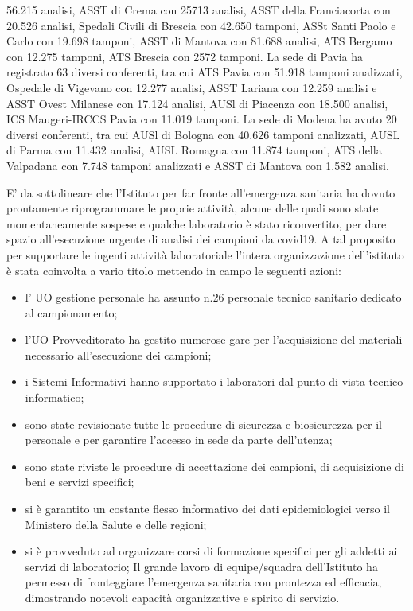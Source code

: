 \documentclass[
  12pt,
]{article}
\providecommand{\tightlist}{%
  \setlength{\itemsep}{0pt}\setlength{\parskip}{0pt}}
\begin{document}
56.215 analisi, ASST di Crema con 25713 analisi, ASST della Franciacorta
con 20.526 analisi, Spedali Civili di Brescia con 42.650 tamponi, ASSt
Santi Paolo e Carlo con 19.698 tamponi, ASST di Mantova con 81.688
analisi, ATS Bergamo con 12.275 tamponi, ATS Brescia con 2572 tamponi.
La sede di Pavia ha registrato 63 diversi conferenti, tra cui ATS Pavia
con 51.918 tamponi analizzati, Ospedale di Vigevano con 12.277 analisi,
ASST Lariana con 12.259 analisi e ASST Ovest Milanese con 17.124
analisi, AUSl di Piacenza con 18.500 analisi, ICS Maugeri-IRCCS Pavia
con 11.019 tamponi. La sede di Modena ha avuto 20 diversi conferenti,
tra cui AUSl di Bologna con 40.626 tamponi analizzati, AUSL di Parma con
11.432 analisi, AUSL Romagna con 11.874 tamponi, ATS della Valpadana con
7.748 tamponi analizzati e ASST di Mantova con 1.582 analisi.

E' da sottolineare che l'Istituto per far fronte all'emergenza sanitaria
ha dovuto prontamente riprogrammare le proprie attività, alcune delle
quali sono state momentaneamente sospese e qualche laboratorio è stato
riconvertito, per dare spazio all'esecuzione urgente di analisi dei
campioni da covid19. A tal proposito per supportare le ingenti attività
laboratoriale l'intera organizzazione dell'istituto è stata coinvolta a
vario titolo mettendo in campo le seguenti azioni:

\begin{itemize}
\tightlist
\item
  l' UO gestione personale ha assunto n.26 personale tecnico sanitario
  dedicato al campionamento;
\item
  l'UO Provveditorato ha gestito numerose gare per l'acquisizione del
  materiali necessario all'esecuzione dei campioni;
\item
  i Sistemi Informativi hanno supportato i laboratori dal punto di vista
  tecnico-informatico;
\item
  sono state revisionate tutte le procedure di sicurezza e biosicurezza
  per il personale e per garantire l'accesso in sede da parte
  dell'utenza;
\item
  sono state riviste le procedure di accettazione dei campioni, di
  acquisizione di beni e servizi specifici;
\item
  si è garantito un costante flesso informativo dei dati epidemiologici
  verso il Ministero della Salute e delle regioni;
\item
  si è provveduto ad organizzare corsi di formazione specifici per gli
  addetti ai servizi di laboratorio; Il grande lavoro di equipe/squadra
  dell'Istituto ha permesso di fronteggiare l'emergenza sanitaria con
  prontezza ed efficacia, dimostrando notevoli capacità organizzative e
  spirito di servizio.
\end{itemize}
\end{document}

